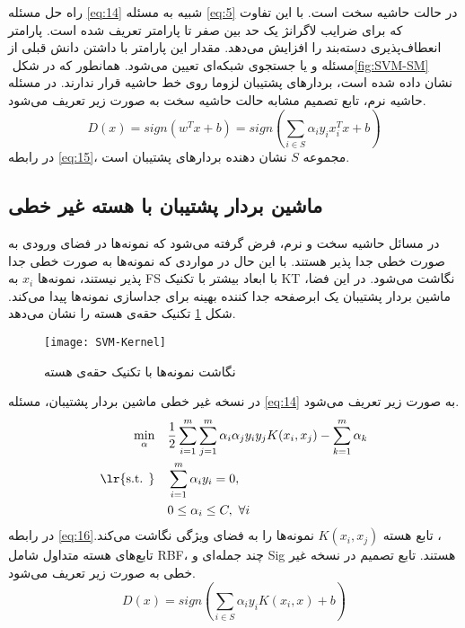 \indent راه حل مسئله \ref{eq:14} شبیه به مسئله \ref{eq:5} در حالت حاشیه سخت است. با این تفاوت که برای ضرایب لاگرانژ یک حد بین صفر تا پارامتر  تعریف شده است. پارامتر  انعطاف‌پذیری دسته‌بند را افزایش می‌دهد. مقدار این پارامتر با داشتن دانش قبلی از مسئله و یا جستجوی شبکه‌ای تعیین می‌شود. همانطور که در شکل ‏\ref{fig:SVM-SM} نشان داده شده است، بردارهای پشتیبان لزوما روی خط حاشیه قرار ندارند. در مسئله حاشیه نرم، تابع تصمیم مشابه حالت حاشیه سخت به صورت زیر تعریف می‌شود.
\begin{equation}
D(x)=sign({{w}^{T}}x+b) = sign(\sum\limits_{i \in S}{\alpha_{i}y_{i}x_{i}^{T}} x + b)
\label{eq:15}
\end{equation}
در رابطه \ref{eq:15}، مجموعه $S$ نشان دهنده بردارهای پشتیبان است.

\subsection{ماشین بردار پشتیبان با هسته غیر خطی}\label{sec:2:1:3}
در مسائل حاشیه سخت و نرم، فرض گرفته می‌شود که نمونه‌ها در فضای ورودی به صورت خطی جدا پذیر هستند. با این حال در مواردی که نمونه‌ها به صورت خطی جدا پذیر نیستند، نمونه‌ها $x_i$ به \gls{FS} با ابعاد بیشتر با تکنیک \gls{KT} نگاشت می‌شود. در این فضا، ماشین بردار پشتیبان یک ابرصفحه جدا کننده بهینه برای جداسازی نمونه‌ها پیدا می‌کند. شکل \ref{fig:SVM-Ker} تکنیک حقه‌ی هسته را نشان می‌دهد.

\begin{figure}[!t]
	\centering
	\texttt{[image: SVM-Kernel]}
	\caption{نگاشت نمونه‌ها با تکنیک حقه‌ی هسته}
	\label{fig:SVM-Ker}
\end{figure}

در نسخه غیر خطی ماشین بردار پشتیبان، مسئله \ref{eq:14} به صورت زیر تعریف می‌شود.
\begin{equation}
\begin{split} 
\min\limits_{\alpha} \quad &\frac{1}{2}\sum\limits_{i=1}^{m}{\sum\limits_{j=1}^{m}{{{\alpha }_{i}}{{\alpha }_{j}}{{y}_{i}}{{y}_{j}}K(x_{i},{{x}_{j}})-\sum\limits_{k=1}^{m}{{{\alpha }_{k}}}}} \\
\textrm{\lr{s.t. }} \quad &\sum\limits_{i=1}^{m}{\alpha_{i}y_{i}}=0, \\
&0 \le \alpha_{i}\le C,\text{ }\forall i
\end{split}
\label{eq:16}
\end{equation}
در رابطه \ref{eq:16}‏، تابع هسته  $K({{x}_{i}},{{x}_{j}})$ نمونه‌ها را به فضای ویژگی نگاشت می‌کند. تابع‌های هسته متداول شامل  \gls{RBF}، چند جمله‌ای و \gls{Sig} هستند. تابع تصمیم در نسخه غیر خطی به صورت زیر تعریف می‌شود.
\begin{equation}
D(x)= sign(\sum\limits_{i \in S}{\alpha_{i}y_{i}}K(x_{i}, x) + b)
\label{eq:17}
\end{equation}


